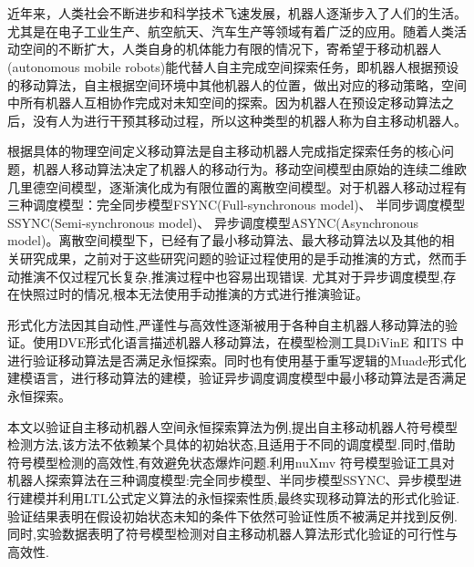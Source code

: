 \vspace{-2.5cm}
\chapter*{}
\vspace{-1cm}

近年来，人类社会不断进步和科学技术飞速发展，机器人逐渐步入了人们的生活。尤其是在电子工业生产、航空航天、汽车生产等领域有着广泛的应用。随着人类活动空间的不断扩大，人类自身的机体能力有限的情况下，寄希望于移动机器人(autonomous mobile robots)能代替人自主完成空间探索任务，即机器人根据预设的移动算法，自主根据空间环境中其他机器人的位置，做出对应的移动策略，空间中所有机器人互相协作完成对未知空间的探索。因为机器人在预设定移动算法之后，没有人为进行干预其移动过程，所以这种类型的机器人称为自主移动机器人。

根据具体的物理空间定义移动算法是自主移动机器人完成指定探索任务的核心问题，机器人移动算法决定了机器人的移动行为。移动空间模型由原始的连续二维欧几里德空间模型，逐渐演化成为有限位置的离散空间模型。对于机器人移动过程有三种调度模型：完全同步模型FSYNC(Full-synchronous model)、 半同步调度模型SSYNC(Semi-synchronous model)、 异步调度模型ASYNC(Asynchronous model)。离散空间模型下，已经有了最小移动算法、最大移动算法以及其他的相关研究成果，之前对于这些研究问题的验证过程使用的是手动推演的方式，然而手动推演不仅过程冗长复杂,推演过程中也容易出现错误. 尤其对于异步调度模型,存在快照过时的情况,根本无法使用手动推演的方式进行推演验证。

形式化方法因其自动性,严谨性与高效性逐渐被用于各种自主机器人移动算法的验证。使用DVE形式化语言描述机器人移动算法，在模型检测工具DiVinE 和ITS 中进行验证移动算法是否满足永恒探索。同时也有使用基于重写逻辑的Muade形式化建模语言，进行移动算法的建模，验证异步调度调度模型中最小移动算法是否满足永恒探索。

本文以验证自主移动机器人空间永恒探索算法为例,提出自主移动机器人符号模型检测方法,该方法不依赖某个具体的初始状态,且适用于不同的调度模型.同时,借助符号模型检测的高效性,有效避免状态爆炸问题.利用nuXmv 符号模型验证工具对机器人探索算法在三种调度模型:完全同步模型、半同步模型SSYNC、异步模型进行建模并利用LTL公式定义算法的永恒探索性质,最终实现移动算法的形式化验证.验证结果表明在假设初始状态未知的条件下依然可验证性质不被满足并找到反例.同时,实验数据表明了符号模型检测对自主移动机器人算法形式化验证的可行性与高效性.


\hspace{-0.5cm}
 
